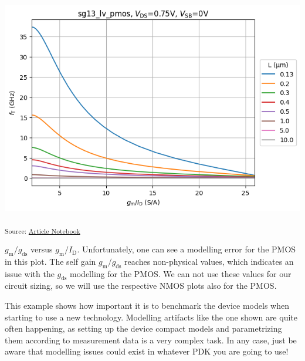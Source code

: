\documentclass[
  a4paper,
  DIV=11,
  numbers=noendperiod]{scrartcl}
\begin{document}
\includegraphics{index_files/figure-latex/.-sizing-techsweep_sg13_plots_pmos-cell-9-output-1.png}

\textsubscript{Source:
\href{https://iic-jku.github.io/analog-circuit-design/index.qmd.html}{Article
Notebook}}

\(g_\mathrm{m}/ g_\mathrm{ds}\) versus \(g_\mathrm{m}/I_\mathrm{D}\).
Unfortunately, one can see a modelling error for the PMOS in this plot.
The self gain \(g_\mathrm{m}/ g_\mathrm{ds}\) reaches non-physical
values, which indicates an issue with the \(g_\mathrm{ds}\) modelling
for the PMOS. We can not use these values for our circuit sizing, so we
will use the respective NMOS plots also for the PMOS.

\begin{tcolorbox}[enhanced jigsaw, breakable, title=\textcolor{quarto-callout-important-color}{\faExclamation}\hspace{0.5em}{Beware of Modelling Issues}, left=2mm, bottomrule=.15mm, opacitybacktitle=0.6, opacityback=0, colframe=quarto-callout-important-color-frame, leftrule=.75mm, bottomtitle=1mm, colbacktitle=quarto-callout-important-color!10!white, toprule=.15mm, rightrule=.15mm, toptitle=1mm, titlerule=0mm, arc=.35mm, colback=white, coltitle=black]

This example shows how important it is to benchmark the device models
when starting to use a new technology. Modelling artifacts like the one
shown are quite often happening, as setting up the device compact models
and parametrizing them according to measurement data is a very complex
task. In any case, just be aware that modelling issues could exist in
whatever PDK you are going to use!

\end{tcolorbox}
\end{document}

